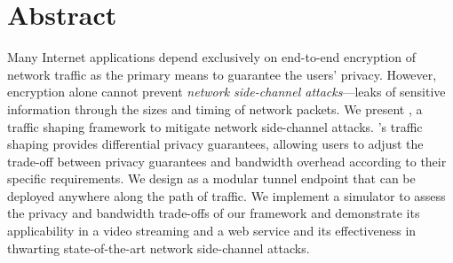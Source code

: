\chapter{Abstract}
\label{ch:abstract}
Many Internet applications depend exclusively on end-to-end encryption of network traffic as the primary means to guarantee the users' privacy.
However, encryption alone cannot prevent {\em network side-channel attacks}---leaks of sensitive information through the sizes and timing of network packets.
We present {\sys}, a traffic shaping framework to mitigate network side-channel attacks.
{\sys}’s traffic shaping provides differential privacy guarantees, allowing users to adjust the trade-off between privacy guarantees and bandwidth overhead according to their specific requirements.
We design {\sys} as a modular tunnel endpoint that can be deployed anywhere along the path of traffic.
We implement a simulator to assess the privacy and bandwidth trade-offs of our framework and demonstrate its applicability in a video streaming and a web service and its effectiveness in thwarting state-of-the-art network side-channel attacks.